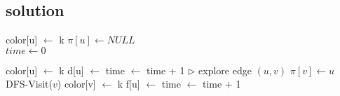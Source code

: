 \subsection{solution}

\begin{algorithmic}
        \State color[u] $\gets$ k
        \State $\pi[u] \gets NULL$
    \EndFor \\
    \State $time \gets 0$
\EndFunction
\end{algorithmic}

\begin{algorithmic}
    \State color[u] $\gets$ k
    \State d[u] $\gets$ time $\gets$ time + 1
      \State $\triangleright$ explore edge $(u,v)$
          \State $\pi[v] \gets u$
          \State DFS-Visit($v$)
      \EndIf
    \EndFor
    \State color[v] $\gets$  k
    \State f[u] $\gets$ time $\gets$ time + 1
\EndFunction
\end{algorithmic}